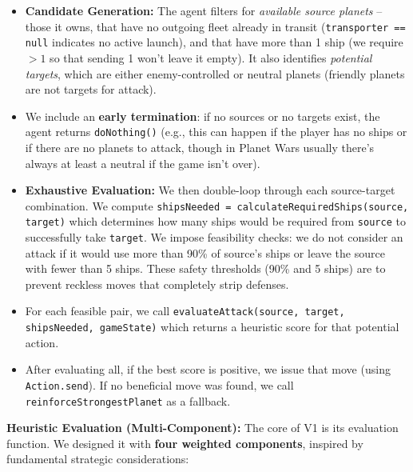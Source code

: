 \documentclass[conference]{IEEEtran}
\begin{document}
\begin{itemize}
\item \textbf{Candidate Generation:} The agent filters for \textit{available source planets} -- those it owns, that have no outgoing fleet already in transit (\texttt{transporter == null} indicates no active launch), and that have more than 1 ship (we require $>1$ so that sending 1 won't leave it empty). It also identifies \textit{potential targets}, which are either enemy-controlled or neutral planets (friendly planets are not targets for attack).

\item We include an \textbf{early termination}: if no sources or no targets exist, the agent returns \texttt{doNothing()} (e.g., this can happen if the player has no ships or if there are no planets to attack, though in Planet Wars usually there's always at least a neutral if the game isn't over).

\item \textbf{Exhaustive Evaluation:} We then double-loop through each source-target combination. We compute \texttt{shipsNeeded = calculateRequiredShips\linebreak(source, target)} which determines how many ships would be required from \texttt{source} to successfully take \texttt{target}. We impose feasibility checks: we do not consider an attack if it would use more than 90\% of source's ships or leave the source with fewer than 5 ships. These safety thresholds (90\% and 5 ships) are to prevent reckless moves that completely strip defenses.

\item For each feasible pair, we call \texttt{evaluateAttack\linebreak(source, target, shipsNeeded, gameState)} which returns a heuristic score for that potential action.

\item After evaluating all, if the best score is positive, we issue that move (using \texttt{Action.send}). If no beneficial move was found, we call \texttt{reinforceStrongestPlanet} as a fallback.
\end{itemize}

\textbf{Heuristic Evaluation (Multi-Component):} The core of V1 is its evaluation function. We designed it with \textbf{four weighted components}, inspired by fundamental strategic considerations:
\end{document}
